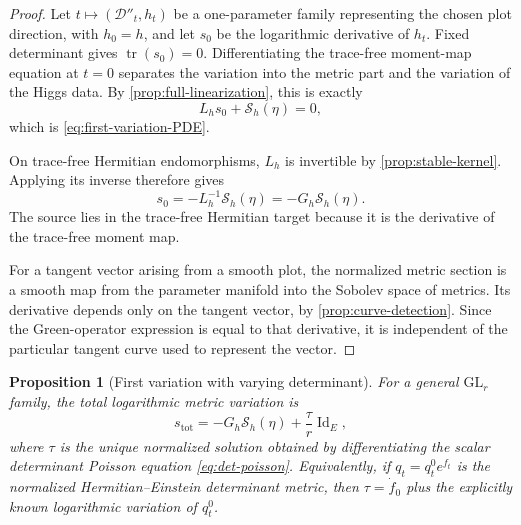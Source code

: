 \documentclass[11pt,reqno]{amsart}
\newtheorem{proposition}[theorem]{Proposition}
\theoremstyle{definition}
\theoremstyle{remark}
\newcommand{\cD}{\mathcal D}
\newcommand{\cS}{\mathcal S}
\newcommand{\Id}{\operatorname{Id}}
\newcommand{\tr}{\operatorname{tr}}
\begin{document}
\begin{proof}
Let $t\mapsto(\cD''_t,h_t)$ be a one-parameter family representing the chosen plot direction, with $h_0=h$, and let $s_0$ be the logarithmic derivative of $h_t$.  Fixed determinant gives $\tr(s_0)=0$.  Differentiating the trace-free moment-map equation at $t=0$ separates the variation into the metric part and the variation of the Higgs data.  By \cref{prop:full-linearization}, this is exactly
\[
  L_hs_0+\cS_h(\eta)=0,
\]
which is \eqref{eq:first-variation-PDE}.

On trace-free Hermitian endomorphisms, $L_h$ is invertible by \cref{prop:stable-kernel}.  Applying its inverse therefore gives
\[
  s_0=-L_h^{-1}\cS_h(\eta)=-G_h\cS_h(\eta).
\]
The source lies in the trace-free Hermitian target because it is the derivative of the trace-free moment map.

For a tangent vector arising from a smooth plot, the normalized metric section is a smooth map from the parameter manifold into the Sobolev space of metrics.  Its derivative depends only on the tangent vector, by \cref{prop:curve-detection}.  Since the Green-operator expression is equal to that derivative, it is independent of the particular tangent curve used to represent the vector.
\end{proof}

\begin{proposition}[First variation with varying determinant]\label{prop:first-variation-general-GL}
For a general $\mathrm{GL}_r$ family, the total logarithmic metric variation is
\begin{equation}\label{eq:first-variation-general-GL}
  s_{\mathrm{tot}}
  =-G_h\cS_h(\eta)+\frac{\tau}{r}\Id_E,
\end{equation}
where $\tau$ is the unique normalized solution obtained by differentiating the scalar determinant Poisson equation \eqref{eq:det-poisson}.  Equivalently, if $q_t=q^0_t e^{f_t}$ is the normalized Hermitian--Einstein determinant metric, then $\tau=\dot f_0$ plus the explicitly known logarithmic variation of $q^0_t$.
\end{proposition}
\end{document}
